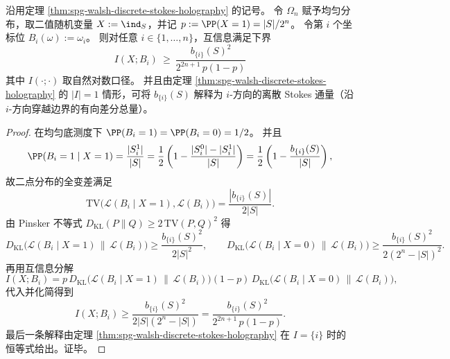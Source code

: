 \begin{corollary}[单坐标互信息的边界通量下界]\label{cor:spg-mutual-information-boundary-flux-lower-bound}
沿用定理 \ref{thm:spg-walsh-discrete-stokes-holography} 的记号。
令 \(\Omega_n\) 赋予均匀分布，取二值随机变量 \(X:=\ind_S\)，并记 \(p:=\PP(X=1)=|S|/2^n\)。
令第 \(i\) 个坐标位 \(B_i(\omega):=\omega_i\)。
则对任意 \(i\in\{1,\dots,n\}\)，互信息满足下界
\[
\boxed{\;
I(X;B_i)\ \ge\ \frac{b_{\{i\}}(S)^2}{2^{2n+1}\,p(1-p)}\;}
\]
其中 \(I(\cdot;\cdot)\) 取自然对数口径。
并且由定理 \ref{thm:spg-walsh-discrete-stokes-holography} 的 \(|I|=1\) 情形，可将 \(b_{\{i\}}(S)\) 解释为 \(i\)-方向的离散 Stokes 通量（沿 \(i\)-方向穿越边界的有向差分总量）。
\end{corollary}
\begin{proof}
在均匀底测度下 \(\PP(B_i=1)=\PP(B_i=0)=1/2\)。
并且
\[
\PP(B_i=1\mid X=1)=\frac{|S_i^1|}{|S|}
=\frac12\left(1-\frac{|S_i^0|-|S_i^1|}{|S|}\right)
=\frac12\left(1-\frac{b_{\{i\}}(S)}{|S|}\right),
\]
故二点分布的全变差满足
\[
\mathrm{TV}\bigl(\mathcal L(B_i\mid X=1),\mathcal L(B_i)\bigr)
=\frac{|b_{\{i\}}(S)|}{2|S|}.
\]
由 Pinsker 不等式 \(D_{\mathrm{KL}}(P\|Q)\ge 2\,\mathrm{TV}(P,Q)^2\) 得
\[
D_{\mathrm{KL}}\bigl(\mathcal L(B_i\mid X=1)\,\|\,\mathcal L(B_i)\bigr)\ge \frac{b_{\{i\}}(S)^2}{2|S|^2},
\qquad
D_{\mathrm{KL}}\bigl(\mathcal L(B_i\mid X=0)\,\|\,\mathcal L(B_i)\bigr)\ge \frac{b_{\{i\}}(S)^2}{2(2^n-|S|)^2}.
\]
再用互信息分解
\[
I(X;B_i)
=p\,D_{\mathrm{KL}}\bigl(\mathcal L(B_i\mid X=1)\,\|\,\mathcal L(B_i)\bigr)
(1-p)\,D_{\mathrm{KL}}\bigl(\mathcal L(B_i\mid X=0)\,\|\,\mathcal L(B_i)\bigr),
\]
代入并化简得到
\[
I(X;B_i)\ge \frac{b_{\{i\}}(S)^2}{2|S|(2^n-|S|)}
=\frac{b_{\{i\}}(S)^2}{2^{2n+1}\,p(1-p)}.
\]
最后一条解释由定理 \ref{thm:spg-walsh-discrete-stokes-holography} 在 \(I=\{i\}\) 时的恒等式给出。证毕。
\end{proof}

\endinput
